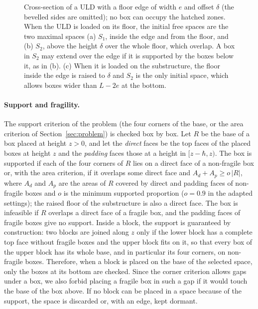 \begin{figure}[htbp]
\centering
\resizebox{\textwidth}{!}{}
\caption{Cross-section of a ULD with a floor edge of width $e$ and offset $\delta$ (the bevelled
sides are omitted); no box can occupy the hatched zones. When the ULD is loaded on its floor, the
initial free spaces are the two maximal spaces (a) $S_1$, inside the edge and from the floor, and
(b) $S_2$, above the height $\delta$ over the whole floor, which overlap. A box in $S_2$ may
extend over the edge if it is supported by the boxes below it, as in (b). (c) When it is loaded
on the substructure, the floor inside the edge is raised to $\delta$ and $S_2$ is the only initial
space, which allows boxes wider than $L - 2e$ at the bottom.}
\label{fig:edge}
\end{figure}

\paragraph{Support and fragility.}
The support criterion of the problem (the four corners of the base, or the area criterion of
Section~\ref{sec:problem}) is checked box by box. Let $R$ be the base of a box placed at height
$z > 0$, and let the \emph{direct} faces be the top faces of the placed boxes at height $z$ and the
\emph{padding} faces those at a height in $[z - \hbar, z)$. The box is supported if each of the
four corners of $R$ lies on a direct face of a non-fragile box or, with the area criterion, if
it overlaps some direct face and $A_d + A_p \ge o\,|R|$, where $A_d$ and $A_p$ are the areas of
$R$ covered by direct and padding faces of non-fragile boxes and $o$ is the minimum supported
proportion ($o = 0.9$ in the adapted settings); the raised floor of the substructure is also a
direct face. The box is infeasible if $R$ overlaps a direct face of a fragile box, and the
padding faces of fragile boxes give no support. Inside a block, the support is guaranteed by
construction: two blocks are joined along $z$ only if the lower block has a complete top face
without fragile boxes and the upper block fits on it, so that every box of the upper block has
its whole base, and in particular its four corners, on non-fragile boxes. Therefore, when a
block is placed on the base of the selected space, only the boxes at its bottom are checked. Since the corner criterion allows gaps under a box, we also forbid placing a fragile box in
such a gap if it would touch the base of the box above. If no block can be placed in a space
because of the support, the space is discarded or, with an edge, kept dormant.


